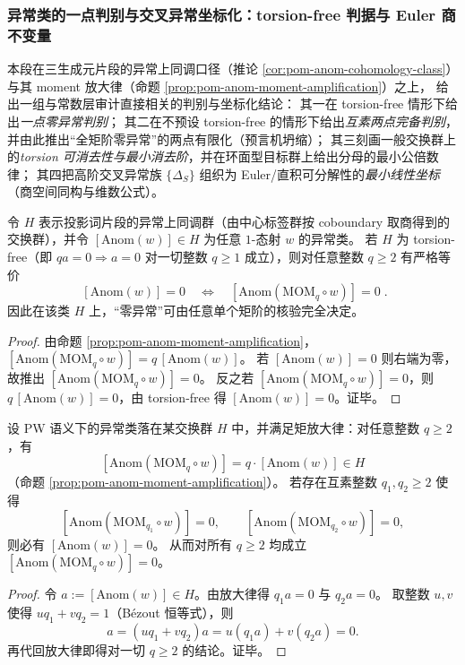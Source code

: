 \subsubsection{异常类的一点判别与交叉异常坐标化：torsion-free 判据与 Euler 商不变量}\label{subsubsec:pom-anom-torsionfree-euler-quotient}
本段在三生成元片段的异常上同调口径（推论 \ref{cor:pom-anom-cohomology-class}）与其 moment 放大律（命题 \ref{prop:pom-anom-moment-amplification}）之上，
给出一组与常数层审计直接相关的判别与坐标化结论：
其一在 torsion-free 情形下给出\emph{一点零异常判别}；
其二在不预设 torsion-free 的情形下给出\emph{互素两点完备判别}，并由此推出“全矩阶零异常”的两点有限化（预言机坍缩）；
其三刻画一般交换群上的\emph{torsion 可消去性与最小消去阶}，并在环面型目标群上给出分母的最小公倍数律；
其四把高阶交叉异常族 \(\{\Delta_S\}\) 组织为 Euler/直积可分解性的\emph{最小线性坐标}（商空间同构与维数公式）。

\begin{corollary}\label{cor:pom-anom-one-point-zero-test}
令 \(H\) 表示投影词片段的异常上同调群（由中心标签群按 coboundary 取商得到的交换群），并令 \([\mathrm{Anom}(w)]\in H\) 为任意 \(1\)-态射 \(w\) 的异常类。
若 \(H\) 为 torsion-free（即 \(qa=0\Rightarrow a=0\) 对一切整数 \(q\ge 1\) 成立），则对任意整数 \(q\ge 2\) 有严格等价
\[
\boxed{\;
[\mathrm{Anom}(w)]=0\quad\Longleftrightarrow\quad [\mathrm{Anom}(\mathrm{MOM}_q\circ w)]=0\; }.
\]
因此在该类 \(H\) 上，“零异常”可由任意单个矩阶的核验完全决定。
\end{corollary}
\begin{proof}
由命题 \ref{prop:pom-anom-moment-amplification}，
\(
[\mathrm{Anom}(\mathrm{MOM}_q\circ w)]=q\,[\mathrm{Anom}(w)]
\)。
若 \([\mathrm{Anom}(w)]=0\) 则右端为零，故推出 \([\mathrm{Anom}(\mathrm{MOM}_q\circ w)]=0\)。
反之若 \([\mathrm{Anom}(\mathrm{MOM}_q\circ w)]=0\)，则 \(q\,[\mathrm{Anom}(w)]=0\)，由 torsion-free 得 \([\mathrm{Anom}(w)]=0\)。证毕。
\end{proof}

\begin{theorem}\label{thm:pom-anom-coprime-two-point-test}
设 PW 语义下的异常类落在某交换群 \(H\) 中，并满足矩放大律：对任意整数 \(q\ge 2\)，有
\[
[\mathrm{Anom}(\mathrm{MOM}_q\circ w)]=q\cdot[\mathrm{Anom}(w)]\in H
\]
（命题 \ref{prop:pom-anom-moment-amplification}）。
若存在互素整数 \(q_1,q_2\ge 2\) 使得
\[
[\mathrm{Anom}(\mathrm{MOM}_{q_1}\circ w)]=0,\qquad
[\mathrm{Anom}(\mathrm{MOM}_{q_2}\circ w)]=0,
\]
则必有 \([\mathrm{Anom}(w)]=0\)。
从而对所有 \(q\ge 2\) 均成立 \([\mathrm{Anom}(\mathrm{MOM}_{q}\circ w)]=0\)。
\end{theorem}
\begin{proof}
令 \(a:=[\mathrm{Anom}(w)]\in H\)。由放大律得 \(q_1 a=0\) 与 \(q_2 a=0\)。
取整数 \(u,v\) 使得 \(u q_1+v q_2=1\)（Bézout 恒等式），则
\[
a=(u q_1+v q_2)a=u(q_1 a)+v(q_2 a)=0.
\]
再代回放大律即得对一切 \(q\ge 2\) 的结论。证毕。
\end{proof}

